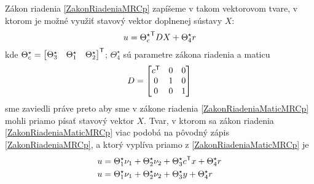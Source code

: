 \documentclass[a4paper, 10pt, ]{article}
\begin{document}
Zákon riadenia \eqref{ZakonRiadeniaMRCp} zapíšeme v takom vektorovom tvare, v ktorom je možné využiť stavový vektor doplnenej sústavy $X$:
\begin{equation} \label{ZakonRiadeniaMaticMRCp}
	u = {\Theta_c^\star}^{\mathsf{T}} D X + \Theta_4^\star r
\end{equation}
kde $ \Theta_c^\star = \begin{bmatrix} \Theta_3^\star & \Theta_1^\star & \Theta_2^\star \end{bmatrix}^{\mathsf{T}} $; $\Theta_4^\star$ sú parametre zákona riadenia a maticu
\begin{align*}
	D = \begin{bmatrix} c^{\mathsf{T}} & 0 & 0 \\ 0 & 1 & 0 \\ 0 & 0 & 1 \end{bmatrix}
\end{align*}
sme zaviedli práve preto aby sme v zákone riadenia \eqref{ZakonRiadeniaMaticMRCp} mohli priamo písať stavový vektor $X$. Tvar, v ktorom sa zákon riadenia \eqref{ZakonRiadeniaMaticMRCp} viac podobá na pôvodný zápis \eqref{ZakonRiadeniaMRCp}, a ktorý vyplíva priamo z \eqref{ZakonRiadeniaMaticMRCp} je
\begin{subequations} \label{ZakonRiadeniaMaticMRCp_02}
	\begin{align}
		u &= \Theta_1^\star \nu_1 + \Theta_2^\star \nu_2 + \Theta_3^\star {c}^{\mathsf{T}} x + \Theta_4^\star r \\
		u &= \Theta_1^\star \nu_1 + \Theta_2^\star \nu_2 + \Theta_3^\star y + \Theta_4^\star r
	\end{align}
\end{subequations}
\end{document}
